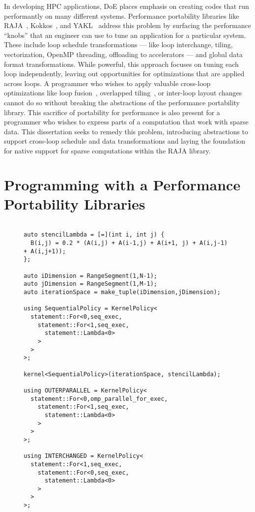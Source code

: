 In developing HPC applications, DoE places emphasis on creating codes that run performantly on many different systems.
Performance portability libraries like RAJA~\cite{hornung2014RAJA}, Kokkos~\cite{edwards2014kokkos}, and YAKL~\cite{norman2022portable} address this problem by surfacing the performance ``knobs'' that an engineer can use to tune an application for a particular system. 
These include loop schedule transformations --- like loop interchange, tiling, vectorization, OpenMP threading, offloading to accelerators --- and global data format transformations.
While powerful, this approach focuses on tuning each loop independently, leaving out opportunities for optimizations that are applied across loops.
A programmer who wishes to apply valuable cross-loop optimizations like loop fusion~\cite{todo}, overlapped tiling~\cite{bertolacci2019using,todoCathySCPaper, todoOVerlappedTilingIntroPaper}, or inter-loop layout changes~\cite{kennedy1995automatic,kennedy1998automatic} cannot do so without breaking the abstractions of the performance portability library.
This sacrifice of portability for performance is also present for a programmer who wishes to express parts of a computation that work with sparse data.
This dissertation seeks to remedy this problem, introducing abstractions to support cross-loop schedule and data transformations and laying the foundation for native support for sparse computations within the RAJA library.

\section{Programming with a Performance Portability Libraries}

\begin{figure}
\begin{lstlisting}[]

auto stencilLambda = [=](int i, int j) {
  B(i,j) = 0.2 * (A(i,j) + A(i-1,j) + A(i+1, j) + A(i,j-1) + A(i,j+1));
};

auto iDimension = RangeSegment(1,N-1);
auto jDimension = RangeSegment(1,M-1);
auto iterationSpace = make_tuple(iDimension,jDimension);

using SequentialPolicy = KernelPolicy<
  statement::For<0,seq_exec,
    statement::For<1,seq_exec,
      statement::Lambda<0>
    >
  >
>;

kernel<SequentialPolicy>(iterationSpace, stencilLambda);

using OUTERPARALLEL = KernelPolicy<
  statement::For<0,omp_parallel_for_exec,
    statement::For<1,seq_exec,
      statement::Lambda<0>
    >
  >
>;

using INTERCHANGED = KernelPolicy<
  statement::For<1,seq_exec,
    statement::For<0,seq_exec,
      statement::Lambda<0>
    >
  >
>;

\end{lstlisting}
\end{figure}

